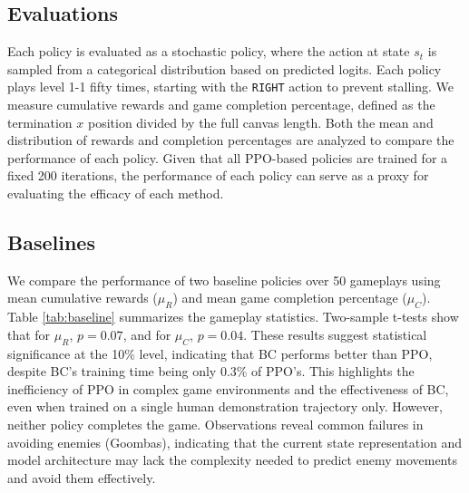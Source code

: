 \documentclass{article}
\begin{document}
\subsection{Evaluations}
Each policy is evaluated as a stochastic policy, where the action 
at state $s_t$ is sampled from a categorical distribution based on 
predicted logits. Each policy plays level 1-1 fifty times, starting 
with the \texttt{RIGHT} action to prevent stalling. We measure 
cumulative rewards and game completion percentage, defined as the 
termination $x$ position divided by the full canvas length. Both 
the mean and distribution of rewards and completion percentages 
are analyzed to compare the performance of each policy.
Given that all PPO-based policies are trained for a fixed 200 iterations,
the performance of each policy can serve as a proxy for evaluating the
efficacy of each method.


\subsection{Baselines}

We compare the performance of two baseline policies over 50 gameplays 
using mean cumulative rewards ($\mu_R$) and mean game completion 
percentage ($\mu_C$). Table \ref{tab:baseline} summarizes the gameplay 
statistics. Two-sample t-tests show that for $\mu_R$, $p=0.07$, and 
for $\mu_C$, $p=0.04$. These results suggest statistical significance 
at the 10\% level, indicating that BC performs better than PPO, despite 
BC's training time being only 0.3\% of PPO's. This highlights the 
inefficiency of PPO in complex game environments and the effectiveness 
of BC, even when trained on a single human demonstration trajectory only. 
However, neither policy completes the game. Observations reveal common 
failures in avoiding enemies (Goombas), indicating that the current 
state representation and model architecture may lack the complexity 
needed to predict enemy movements and avoid them effectively.


\begin{table}[htbp]
      \centering
      \caption{Performance of baseline policies.}
      \label{tab:baseline}
\end{table}
\end{document}
